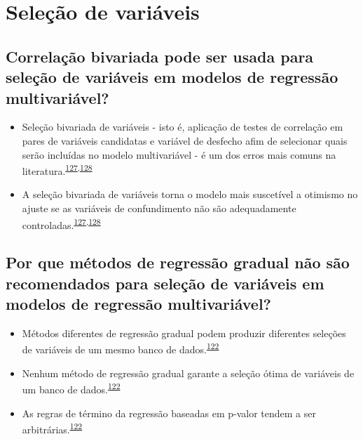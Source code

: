 \documentclass[
]{book}
\begin{document}
\hypertarget{selecao}{%
\section{Seleção de variáveis}\label{selecao}}

\hypertarget{correlauxe7uxe3o-bivariada-pode-ser-usada-para-seleuxe7uxe3o-de-variuxe1veis-em-modelos-de-regressuxe3o-multivariuxe1vel}{%
\subsection{Correlação bivariada pode ser usada para seleção de variáveis em modelos de regressão multivariável?}\label{correlauxe7uxe3o-bivariada-pode-ser-usada-para-seleuxe7uxe3o-de-variuxe1veis-em-modelos-de-regressuxe3o-multivariuxe1vel}}

\begin{itemize}
\item
  Seleção bivariada de variáveis - isto é, aplicação de testes de correlação em pares de variáveis candidatas e variável de desfecho afim de selecionar quais serão incluídas no modelo multivariável - é um dos erros mais comuns na literatura.\textsuperscript{\protect\hyperlink{ref-Dales1978}{127},\protect\hyperlink{ref-Sun1996}{128}}
\item
  A seleção bivariada de variáveis torna o modelo mais suscetível a otimismo no ajuste se as variáveis de confundimento não são adequadamente controladas.\textsuperscript{\protect\hyperlink{ref-Dales1978}{127},\protect\hyperlink{ref-Sun1996}{128}}
\end{itemize}

\hypertarget{por-que-muxe9todos-de-regressuxe3o-gradual-nuxe3o-suxe3o-recomendados-para-seleuxe7uxe3o-de-variuxe1veis-em-modelos-de-regressuxe3o-multivariuxe1vel}{%
\subsection{Por que métodos de regressão gradual não são recomendados para seleção de variáveis em modelos de regressão multivariável?}\label{por-que-muxe9todos-de-regressuxe3o-gradual-nuxe3o-suxe3o-recomendados-para-seleuxe7uxe3o-de-variuxe1veis-em-modelos-de-regressuxe3o-multivariuxe1vel}}

\begin{itemize}
\item
  Métodos diferentes de regressão gradual podem produzir diferentes seleções de variáveis de um mesmo banco de dados.\textsuperscript{\protect\hyperlink{ref-Healy1995}{122}}
\item
  Nenhum método de regressão gradual garante a seleção ótima de variáveis de um banco de dados.\textsuperscript{\protect\hyperlink{ref-Healy1995}{122}}
\item
  As regras de término da regressão baseadas em p-valor tendem a ser arbitrárias.\textsuperscript{\protect\hyperlink{ref-Healy1995}{122}}
\end{itemize}
\end{document}

